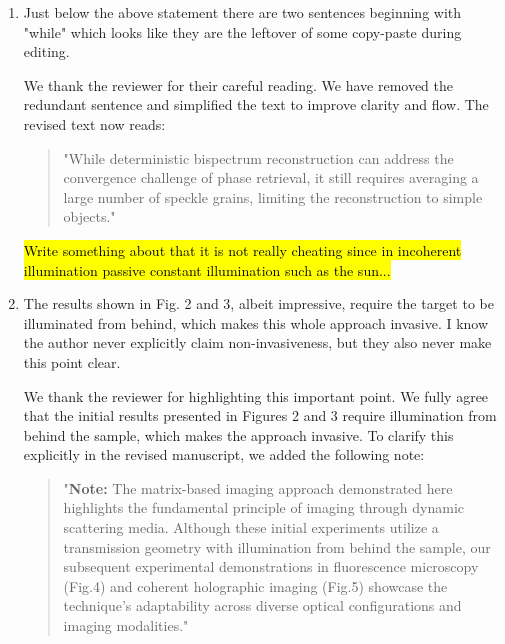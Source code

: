 \documentclass[12pt]{article}
\newcommand{\hlred}[1]{\sethlcolor{red!30}\hl{#1}}
\newenvironment{solved_reviewercomment}
    {\begin{tcolorbox}[width=\linewidth,colback=gray!5,colframe=solved_commentcolor!50,title=Reviewer Comment,left=5pt,right=5pt]}
    {\end{tcolorbox}}
\newenvironment{ourresponse}
    {\begin{tcolorbox}[width=\linewidth,breakable,enhanced,colback=gray!5,colframe=responsecolor!50,title=Response,left=5pt,right=5pt]}
    {\end{tcolorbox}}
\begin{document}
\begin{enumerate}[label=\arabic*.]
\begin{enumerate}[label=3.\alph*.]
        \item \leavevmode\vspace{-\baselineskip}
        \begin{solved_reviewercomment}
            Just below the above statement there are two sentences beginning with "while" which looks like they are the leftover of some copy-paste during editing.
        \end{solved_reviewercomment}
        \begin{ourresponse}
            We thank the reviewer for their careful reading. We have removed the redundant sentence and simplified the text to improve clarity and flow. The revised text now reads:
            \begin{quote}
                "While deterministic bispectrum reconstruction can address the convergence challenge of phase retrieval, it still requires averaging a large number of speckle grains, limiting the reconstruction to simple objects."
            \end{quote}
        \end{ourresponse}
        \hlred{Write something about that it is not really cheating since in incoherent illumination passive constant illumination such as the sun...}
        \item \leavevmode\vspace{-\baselineskip}
        \begin{solved_reviewercomment}
            The results shown in Fig. 2 and 3, albeit impressive, require the target to be illuminated from behind, which makes this whole approach invasive. I know the author never explicitly claim non-invasiveness, but they also never make this point clear.
        \end{solved_reviewercomment}
        \begin{ourresponse}
            We thank the reviewer for highlighting this important point.
            We fully agree that the initial results presented in Figures 2 and 3 require illumination from behind the sample, which makes the approach invasive. To clarify this explicitly in the revised manuscript, we added the following note:
            \begin{quote}
                "\textbf{Note:} The matrix-based imaging approach demonstrated here highlights the fundamental principle of imaging through dynamic scattering media. Although these initial experiments utilize a transmission geometry with illumination from behind the sample, our subsequent experimental demonstrations in fluorescence microscopy (Fig.4) and coherent holographic imaging (Fig.5) showcase the technique's adaptability across diverse optical configurations and imaging modalities."
            \end{quote}
            

\end{ourresponse}
\end{enumerate}
\end{enumerate}
\end{document}
